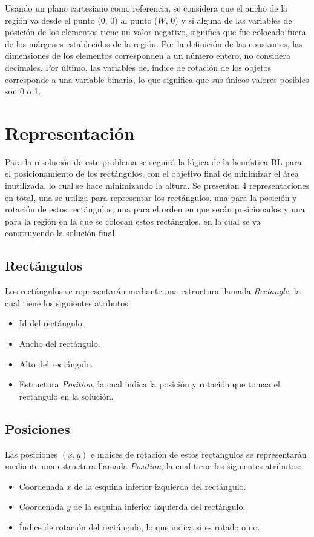 \documentclass[letter, 10pt]{article}
\begin{document}
Usando un plano cartesiano como referencia, se considera que el ancho de la regi\'on va desde el punto (0, 0) al punto ($W$, 0) y si alguna de las variables de posici\'on de los elementos tiene un valor negativo, significa que fue colocado fuera de los m\'argenes establecidos de la regi\'on. Por la definici\'on de las constantes, las dimensiones de los elementos corresponden a un n\'umero entero, no considera decimales. Por \'ultimo, las variables del \'indice de rotaci\'on de los objetos corresponde a una variable binaria, lo que significa que sus \'unicos valores posibles son 0 o 1.

\section{Representaci\'on}

Para la resoluci\'on de este problema se seguir\'a la l\'ogica de la heur\'istica BL para el posicionamiento de los rect\'angulos, con el objetivo final de minimizar el \'area inutilizada, lo cual se hace minimizando la altura. Se presentan 4 representaciones en total, una se utiliza para representar los rect\'angulos, una para la posici\'on y rotaci\'on de estos rect\'angulos, una para el orden en que ser\'an posicionados y una para la regi\'on en la que se colocan estos rect\'angulos, en la cual se va construyendo la soluci\'on final.

\subsection{Rect\'angulos}
Los rect\'angulos se representar\'an mediante una estructura llamada \emph{Rectangle}, la cual tiene los siguientes atributos:
\begin{itemize}
    \item Id del rect\'angulo.
    \item Ancho del rect\'angulo.
    \item Alto del rect\'angulo.
    \item Estructura \emph{Position}, la cual indica la posici\'on y rotaci\'on que tomaa el rect\'angulo en la soluci\'on. 
\end{itemize}

\subsection{Posiciones}

Las posiciones $(x,y)$ e \'indices de rotaci\'on de estos rect\'angulos se representar\'an mediante una estructura llamada \emph{Position}, la cual tiene los siguientes atributos:
\begin{itemize}
    \item Coordenada $x$ de la esquina inferior izquierda del rect\'angulo.
    \item Coordenada $y$ de la esquina inferior izquierda del rect\'angulo.
    \item \'Indice de rotaci\'on del rect\'angulo, lo que indica si es rotado o no.
\end{itemize}
\end{document}
